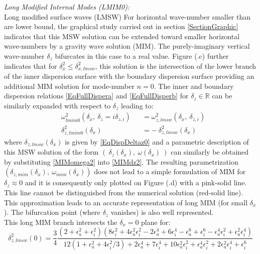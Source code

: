 \documentclass[a4paper,11pt]{article}
\begin{document}
\textit{Long Modified Internal Modes (LMIM0):}\\
Long modified surface waves (LMSW)
For horizontal wave-number smaller than are lower bound, the graphical study carried out in section \ref{SectionGraphic} indicates that this MSW solution can be extended toward smaller horizontal wave-numbers by a gravity wave solution (MIM). The purely-imaginary vertical wave-number $\delta_z$ bifurcates in this case to a real value. Figure (.c) further indicates that for $\delta_x^2 \leq \delta_{x,lmsw}^2$, this solution is the intersection of the lower branch of the inner dispersion surface with the boundary dispersion surface providing an additional MIM solution for mode-number $n=0$. 
The inner and boundary dispersion relations \ref{EqFullDispera} and \ref{EqFullDisperb} for $\delta_z\in\mathbb{R}$ can be similarly expanded with respect to $\delta_z$ leading to:
\begin{subequations}
	\begin{alignat}{2}
	\label{MIMomega2}
     	& \omega_{lmim0}^2(\delta_x,\ \delta_z=i\delta_{z,i}) &&=
     	  \omega_{z,lmsw}^2(\delta_x,\ \delta_{z,i})\\[3mm]
	\label{MIMdz2}
 	 &\delta_{z,lmim0}^2(\delta_x) &&= -\ \delta_{z,lmsw}^2(\delta_x)
 	\end{alignat}
\end{subequations}
where $\delta_{z,lmsw}(\delta_x)$ is given by \ref{EqDispDeltaz0} and a parametric description of this MSW solution of the form $(\ \delta_z(\delta_x),\ \omega(\delta_x)\ )$ can similarly be obtained by substituting \ref{MIMomega2} into \ref{MIMdz2}. The resulting parametrization $(\delta_{z,mim}(\delta_x),\ \omega_{mim}(\delta_x))$ does not lead to a simple formulation of MIM for $\delta_z\approx0$ and it is consequently only plotted on Figure (.d) with a pink-solid line. This line cannot be distinguished from the numerical solution (red-solid line). This approximation leads to an accurate representation of long MIM (for small $\delta_x$). The bifurcation point (where $\delta_z$ vanishes) is also well represented.\\
This long MIM branch intersects the $\delta_x=0$ plane for:
\begin{equation}
	\label{EqDispDeltaz0MIM}
 		\delta_{z,lmsw}^2(0)
 		=\frac{3}{4}
 		\frac{
 		(2+\epsilon_a^2+\epsilon_i^2)
 		\left(
 		8\epsilon_i^2+4\epsilon_a^2\epsilon_i^2
 		-2\epsilon_a^4+6\epsilon_i^4
 		-\epsilon_a^6+\epsilon_i^6
 		-\epsilon_a^4\epsilon_i^2
 		+\epsilon_a^2\epsilon_i^4
 		\right)
 		}
 		{
 		12(1+\epsilon_a^2+4\epsilon_i^2/3)
 		+2\epsilon_a^4+7\epsilon_i^4
 		+10\epsilon_a^2\epsilon_i^2
 		+\epsilon_a^4\epsilon_i^2
 		+2\epsilon_a^2\epsilon_i^4
 		+\epsilon_i^6
 		}
\end{equation}
\end{document}
